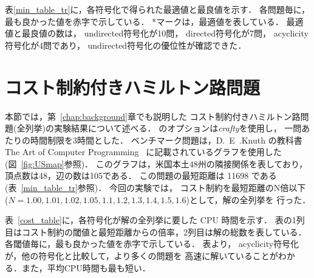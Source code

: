 表\ref{min_table_tr}に，各符号化で得られた最適値と最良値を示す．
各問題毎に，最も良かった値を赤字で示している．
*マークは，最適値を表している．
最適値と最良値の数は，
\textsf{undirected}符号化が10問，
\textsf{directed}符号化が7問，
\textsf{acyclicity}符号化が4問であり，
\textsf{undirected}符号化の優位性が確認できた．


\section{コスト制約付きハミルトン路問題}


本節では，第~\ref{chap:background}章でも説明した
コスト制約付きハミルトン路問題(全列挙)の実験結果について述べる．
{\clingo}のオプションは\textit{crafty}を使用し，
一問あたりの時間制限を3時間とした．
ベンチマーク問題は，D.~E~.Knuth の教科書
The Art of Computer Programming~\cite{Knuth:TAOCP:SAT}
に記載されているグラフを使用した(図~\ref{fig:USmap}参照)．
このグラフは，米国本土48州の隣接関係を表しており，
頂点数は48，辺の数は105である．
この問題の最短距離は 11698 である(表~\ref{min_table_tr}参照)．
今回の実験では，
コスト制約を最短距離のN倍以下
($N=1.00,1.01,1.02,1.05,1.1,1.2,1.3,1.4,1.5,1.6$)として，解の全列挙を
行った．

表~\ref{cost_table}に，各符号化が解の全列挙に要した CPU 時間を示す．
表の1列目はコスト制約の閾値と最短距離からの倍率，2列目は解の総数を表している．
各閾値毎に，最も良かった値を赤字で示している．
表より，
\textsf{acyclicity}符号化が，他の符号化と比較して，より多くの問題を
高速に解いていることがわかる．また，平均CPU時間も最も短い．

